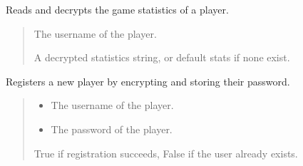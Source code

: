 \documentclass[letterpaper,10pt,english]{sphinxmanual}
\begin{document}

\begin{fulllineitems}
\label{\detokenize{modules:Database_Logic.read_statistics}}
\pysigstartsignatures
{}
\pysigstopsignatures
\sphinxAtStartPar
Reads and decrypts the game statistics of a player.
\begin{quote}\begin{description}
\sphinxAtStartPar
{} \textendash{} The username of the player.

\sphinxAtStartPar
A decrypted statistics string, or default stats if none exist.

\end{description}\end{quote}

\end{fulllineitems}


\begin{fulllineitems}
\label{\detokenize{modules:Database_Logic.register}}
\pysigstartsignatures
{}
\pysigstopsignatures
\sphinxAtStartPar
Registers a new player by encrypting and storing their password.
\begin{quote}\begin{description}
\begin{itemize}
\item {} 
\sphinxAtStartPar
{} \textendash{} The username of the player.

\item {} 
\sphinxAtStartPar
{} \textendash{} The password of the player.

\end{itemize}

\sphinxAtStartPar
True if registration succeeds, False if the user already exists.

\end{description}\end{quote}

\end{fulllineitems}
\end{document}
